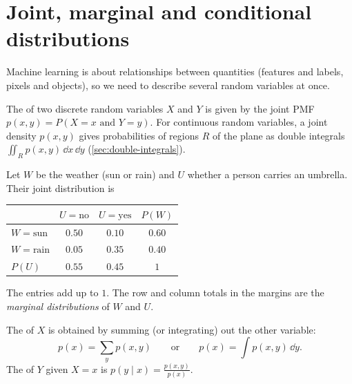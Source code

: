 \section{Joint, marginal and conditional distributions}\label{sec:joint}

Machine learning is about relationships between quantities (features and labels,
pixels and objects), so we need to describe several random variables at once.

\begin{definition}\label{def:joint}
The  of two discrete random variables $X$ and $Y$ is
given by the joint PMF $p(x, y) = P(X = x \text{ and } Y = y)$. For continuous
random variables, a joint density $p(x, y)$ gives probabilities of regions $R$ of
the plane as double integrals $\iint_R p(x, y)\,\dd x\,\dd y$
(\cref{sec:double-integrals}).
\end{definition}

\begin{example}\label{ex:weather}
Let $W$ be the weather (sun or rain) and $U$ whether a person carries an umbrella.
Their joint distribution is
\begin{center}
\begin{tabular}{l|cc|c}
 & $U = \text{no}$ & $U = \text{yes}$ & $P(W)$\\
\hline
$W = \text{sun}$ & $0.50$ & $0.10$ & $0.60$\\
$W = \text{rain}$ & $0.05$ & $0.35$ & $0.40$\\
\hline
$P(U)$ & $0.55$ & $0.45$ & $1$
\end{tabular}
\end{center}
The entries add up to $1$. The row and column totals in the margins are the
\emph{marginal distributions} of $W$ and $U$.
\end{example}

\begin{definition}\label{def:marginal}
The  of $X$ is obtained by summing (or integrating)
out the other variable:
\[
  p(x) = \sum_y p(x, y) \qquad\text{or}\qquad p(x) = \int p(x, y)\,\dd y .
\]
The  of $Y$ given $X = x$ is
$p(y \mid x) = \frac{p(x, y)}{p(x)}$.
\end{definition}

